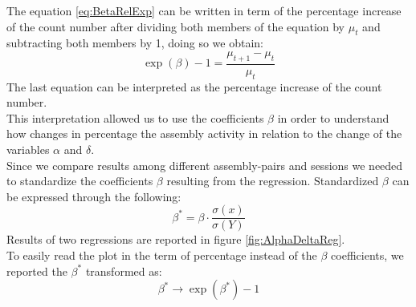 The equation \ref{eq:BetaRelExp} can be written in term of the percentage increase of the count number after dividing both members of the equation by $\mu_t$ and subtracting both members by 1, doing so we obtain:
\begin{equation}
\exp(\beta)-1=\frac{\mu_{t+1}-\mu_t}{\mu_t}
    \label{eq:BetaPerc}
\end{equation}
The last equation can be interpreted as the percentage increase of the count number.\\
This interpretation allowed us to use the coefficients $\beta$ in order to understand how changes in percentage the assembly activity in relation to the change of the variables $\alpha$ and $\delta$.\\Since we compare results among different assembly-pairs and sessions we needed to standardize the coefficients $\beta$ resulting from the regression. Standardized $\beta$ can be expressed through the following:
\begin{equation}
    \beta^*=\beta\cdot\frac{\sigma(x)}{\sigma(Y)}
    \label{eq:betaStand}
\end{equation}
Results of two regressions are reported in figure \ref{fig:AlphaDeltaReg}.\\
To easily read the plot in the term of percentage instead of the $\beta$ coefficients, we reported the $\beta^*$ transformed as:
\begin{equation}
    \beta^*\rightarrow \exp(\beta^*)-1
    \label{eq:BetaPlot}
\end{equation}
